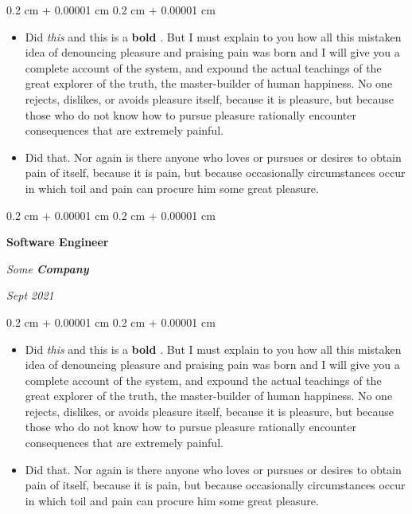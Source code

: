 \documentclass[10pt, letterpaper]{article}
\newenvironment{highlights}{
    \begin{itemize}[
        topsep=0.10 cm,
        parsep=0.10 cm,
        partopsep=0pt,
        itemsep=0pt,
        leftmargin=0.4 cm + 10pt
    ]
}{
    \end{itemize}
} %
\newenvironment{onecolentry}{
    \begin{adjustwidth}{
        0.2 cm + 0.00001 cm
    }{
        0.2 cm + 0.00001 cm
    }
}{
    \end{adjustwidth}
} %
\newenvironment{twocolentry}[2][]{
    \onecolentry
    \def\secondColumn{#2}
    \setcolumnwidth{\fill, 4.5 cm}
    \begin{paracol}{2}
}{
    \switchcolumn \raggedleft \secondColumn
    \end{paracol}
    \endonecolentry
} %
\let\hrefWithoutArrow\href
\renewcommand{\href}[2]{\hrefWithoutArrow{#1}{\ifthenelse{\equal{#2}{}}{ }{#2 }\raisebox{.15ex}{\footnotesize \faExternalLink*}}}
\begin{document}
        \vspace{0.10 cm}
        \begin{onecolentry}
            \begin{highlights}
                \item Did \textit{this} and this is a \textbf{bold} \href{https://example.com}{link}. But I must explain to you how all this mistaken idea of denouncing pleasure and praising pain was born and I will give you a complete account of the system, and expound the actual teachings of the great explorer of the truth, the master-builder of human happiness. No one rejects, dislikes, or avoids pleasure itself, because it is pleasure, but because those who do not know how to pursue pleasure rationally encounter consequences that are extremely painful.
                \item Did that. Nor again is there anyone who loves or pursues or desires to obtain pain of itself, because it is pain, but because occasionally circumstances occur in which toil and pain can procure him some great pleasure.
            \end{highlights}
        \end{onecolentry}


        \vspace{0.2 cm}

        \begin{twocolentry}{
            
            
        \textit{Sept 2021}}
            \textbf{Software Engineer}
            
            \textit{Some \textbf{Company}}
        \end{twocolentry}

        \vspace{0.10 cm}
        \begin{onecolentry}
            \begin{highlights}
                \item Did \textit{this} and this is a \textbf{bold} \href{https://example.com}{link}. But I must explain to you how all this mistaken idea of denouncing pleasure and praising pain was born and I will give you a complete account of the system, and expound the actual teachings of the great explorer of the truth, the master-builder of human happiness. No one rejects, dislikes, or avoids pleasure itself, because it is pleasure, but because those who do not know how to pursue pleasure rationally encounter consequences that are extremely painful.
                \item Did that. Nor again is there anyone who loves or pursues or desires to obtain pain of itself, because it is pain, but because occasionally circumstances occur in which toil and pain can procure him some great pleasure.
            \end{highlights}
        \end{onecolentry}
\end{document}
